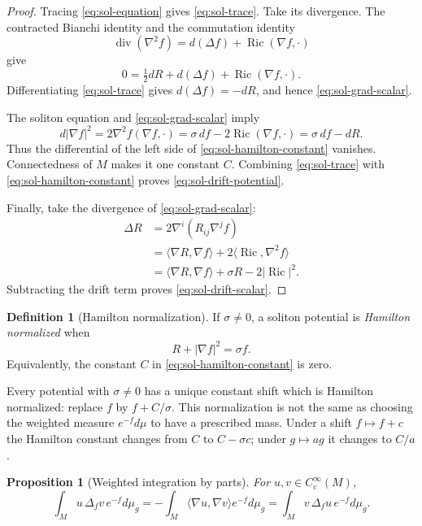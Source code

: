\documentclass[10pt]{coll-l}
\newtheorem{proposition}[theorem]{Proposition}
\theoremstyle{definition}
\newtheorem{definition}[theorem]{Definition}
\theoremstyle{remark}
\numberwithin{section}{chapter}
\numberwithin{equation}{chapter}
\newcommand{\Ric}{\operatorname{Ric}}
\begin{document}
\begin{proof}
Tracing \eqref{eq:sol-equation} gives \eqref{eq:sol-trace}.  Take its
divergence.  The contracted Bianchi identity and the commutation identity
\[
 \operatorname{div}(\nabla^2f)
      =d(\Delta f)+\Ric(\nabla f,\mathord\cdot)
\]
give
\[
 0=\tfrac12dR+d(\Delta f)+\Ric(\nabla f,\mathord\cdot).
\]
Differentiating \eqref{eq:sol-trace} gives $d(\Delta f)=-dR$, and hence
\eqref{eq:sol-grad-scalar}.

The soliton equation and \eqref{eq:sol-grad-scalar} imply
\[
 d|\nabla f|^2
   =2\nabla^2f(\nabla f,\mathord\cdot)
   =\sigma\,df-2\Ric(\nabla f,\mathord\cdot)
   =\sigma\,df-dR.
\]
Thus the differential of the left side of
\eqref{eq:sol-hamilton-constant} vanishes.  Connectedness of $M$ makes it
one constant $C$.  Combining \eqref{eq:sol-trace} with
\eqref{eq:sol-hamilton-constant} proves \eqref{eq:sol-drift-potential}.

Finally, take the divergence of \eqref{eq:sol-grad-scalar}:
\begin{align*}
 \Delta R
 &=2\nabla^i(R_{ij}\nabla^jf)\\
 &=\langle\nabla R,\nabla f\rangle
      +2\langle\Ric,\nabla^2f\rangle\\
 &=\langle\nabla R,\nabla f\rangle
      +\sigma R-2|\Ric|^2.
\end{align*}
Subtracting the drift term proves \eqref{eq:sol-drift-scalar}.
\end{proof}

\begin{definition}[Hamilton normalization]
\label{def:sol-hamilton-normalization}
If $\sigma\ne0$, a soliton potential is \emph{Hamilton normalized} when
\begin{equation}
                  R+|\nabla f|^2=\sigma f.                \label{eq:sol-hamilton-normalized}
\end{equation}
Equivalently, the constant $C$ in
\eqref{eq:sol-hamilton-constant} is zero.
\end{definition}

Every potential with $\sigma\ne0$ has a unique constant shift which is
Hamilton normalized: replace $f$ by $f+C/\sigma$.  This normalization is
not the same as choosing the weighted measure $e^{-f}d\mu$ to have a
prescribed mass.  Under a shift $f\mapsto f+c$ the Hamilton constant changes
from $C$ to $C-\sigma c$; under $g\mapsto ag$ it changes to $C/a$.

\begin{proposition}[Weighted integration by parts]
\label{prop:sol-weighted-integration}
For $u,v\in C_c^\infty(M)$,
\begin{equation}
 \int_Mu\,\Delta_fv\,e^{-f}d\mu_g
   =-\int_M\langle\nabla u,\nabla v\rangle e^{-f}d\mu_g
   =\int_Mv\,\Delta_fu\,e^{-f}d\mu_g.                   \label{eq:sol-weighted-integration}
\end{equation}
\end{proposition}
\end{document}
